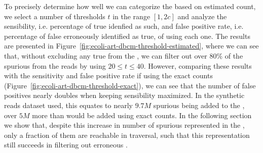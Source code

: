 To precisely determine how well we can categorize the  based on estimated count, we select a number of thresholds $t$ in the range $[1, 2c]$ and analyze the sensibility, i.e. percentage of true  idenfied as such, and false positive rate, i.e. percentage of false  erroneously identified as true, of using each one. The results are presented in Figure~\ref{fig:ecoli-art-dbcm-threshold-estimated}, where we can see that, without excluding any true  from the \dBG, we can filter out over $80\%$ of the spurious  from the reads by using $20 \leq t \leq 40$. However, comparing these results with the sensitivity and false positive rate if using the exact counts (Figure~\ref{fig:ecoli-art-dbcm-threshold-exact}), we can see that the number of false positives nearly doubles when keeping sensibility maximized. In the synthetic reads dataset used, this equates to nearly $9.7M$ spurious  being added to the \dBG, over $5M$ more than would be added using exact counts. In the following section we show that, despite this increase in number of spurious  represented in the \dBCM, only a fraction of them are reachable in traversal, such that this representation still succeeds in filtering out erroneous .

